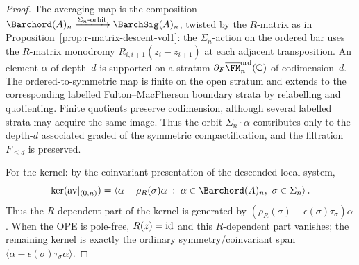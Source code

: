 \begin{proof}
The averaging map is the composition
$\Barchord(A)_n
\xrightarrow{\Sigma_n\text{-orbit}} \BarchSig(A)_n$,
twisted by the $R$-matrix as in
Proposition~\ref{prop:r-matrix-descent-vol1}:
the $\Sigma_n$-action on the ordered bar uses the
$R$-matrix monodromy $R_{i,i+1}(z_i - z_{i+1})$ at each
adjacent transposition. An element $\alpha$ of depth~$d$
is supported on a stratum
	$\partial_F\overline{\FM}_n^{\mathrm{ord}}(\mathbb{C})$
	of codimension~$d$. The ordered-to-symmetric map is finite on the
	open stratum and extends to the corresponding labelled
	Fulton--MacPherson boundary strata by relabelling and quotienting.
	Finite quotients preserve codimension, although several labelled
	strata may acquire the same image. Thus the orbit
	$\Sigma_n\cdot\alpha$ contributes only to the depth-$d$ associated
	graded of the symmetric compactification, and the filtration
	$F_{\leq d}$ is preserved.

For the kernel: by the coinvariant presentation of the descended
local system,
\[
\ker(\mathrm{av}|_{(0,n)})
=
\left\langle
\alpha-\rho_R(\sigma)\alpha
\;:\;
\alpha\in\Barchord(A)_n,\ \sigma\in\Sigma_n
\right\rangle .
\]
Thus the $R$-dependent part of the kernel is generated by
\((\rho_R(\sigma)-\epsilon(\sigma)\tau_\sigma)\alpha\).
When the OPE is pole-free, $R(z)=\mathrm{id}$ and this $R$-dependent part
vanishes; the remaining kernel is exactly the ordinary
symmetry/coinvariant span
\(\langle\alpha-\epsilon(\sigma)\tau_\sigma\alpha\rangle\).
\end{proof}

